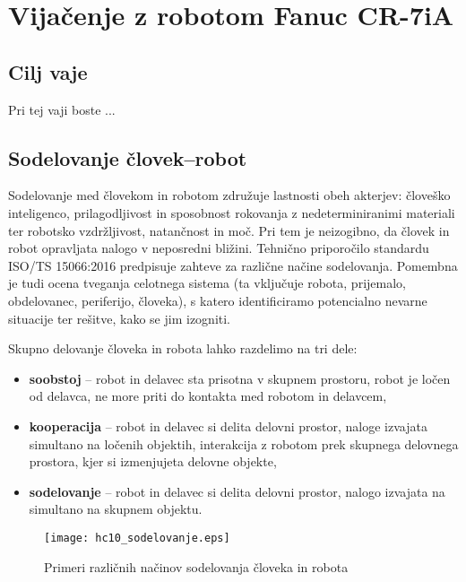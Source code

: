 \chapter{Vijačenje z robotom Fanuc CR-7iA}%


\begin{mdframed}[backgroundcolor=green!20, shadow=true,roundcorner=8pt]
\vspace{-0.35cm}
	
\section{Cilj vaje}
	
Pri tej vaji boste ...
	
\end{mdframed}

\section{Sodelovanje človek--robot}

Sodelovanje med človekom in robotom združuje lastnosti obeh akterjev: človeško inteligenco, prilagodljivost in sposobnost rokovanja z nedeterminiranimi materiali ter robotsko vzdržljivost, natančnost in moč. Pri tem je neizogibno, da človek in robot opravljata nalogo v neposredni bližini. Tehnično priporočilo standardu ISO/TS 15066:2016 predpisuje zahteve za različne načine sodelovanja. Pomembna je tudi ocena tveganja celotnega sistema (ta vključuje robota, prijemalo, obdelovanec, periferijo, človeka), s katero identificiramo potencialno nevarne situacije ter rešitve, kako se jim izogniti.

Skupno delovanje človeka in robota lahko razdelimo na tri dele:
\begin{itemize}
	\item \textbf{soobstoj} -- robot in delavec sta prisotna v skupnem prostoru, robot je ločen od delavca, ne more priti do kontakta med robotom in delavcem,
	\item \textbf{kooperacija} -- robot in delavec si delita delovni prostor, naloge izvajata simultano na ločenih objektih, interakcija z robotom prek skupnega delovnega prostora, kjer si izmenjujeta delovne objekte,
	\item  \textbf{sodelovanje} -- robot in delavec si delita delovni prostor, nalogo izvajata na simultano na skupnem objektu.
\end{itemize}


\begin{figure}[!hbt]
	\centering
	\texttt{[image: hc10\_sodelovanje.eps]}
	\caption{Primeri različnih načinov sodelovanja človeka in robota}
	\label{fig:hc10_sodel}
\end{figure}


